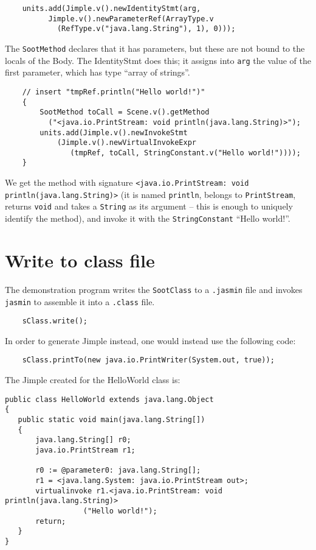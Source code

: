 \documentclass{article}
\begin{document}
\begin{verbatim}
    units.add(Jimple.v().newIdentityStmt(arg, 
          Jimple.v().newParameterRef(ArrayType.v
            (RefType.v("java.lang.String"), 1), 0)));
\end{verbatim}

The {\tt SootMethod} declares that it has parameters, but these are not
bound to the locals of the Body.  The IdentityStmt does this; it assigns
into {\tt arg} the value of the first parameter, which has type ``array of
strings''.

\begin{verbatim}
    // insert "tmpRef.println("Hello world!")"
    {
        SootMethod toCall = Scene.v().getMethod
          ("<java.io.PrintStream: void println(java.lang.String)>");
        units.add(Jimple.v().newInvokeStmt
            (Jimple.v().newVirtualInvokeExpr
               (tmpRef, toCall, StringConstant.v("Hello world!"))));
    }
\end{verbatim}                      

We get the method with signature 
{\tt <java.io.PrintStream: void println(java.lang.String)>}
(it is named {\tt println}, belongs to {\tt PrintStream}, returns 
{\tt void} and
takes a {\tt String} as its argument -- this is enough to uniquely
identify the method), and invoke it with the {\tt StringConstant} 
``Hello world!''.

\section{Write to class file}

The demonstration program writes the {\tt SootClass} to a {\tt .jasmin}
file and invokes {\tt jasmin} to assemble it into a {\tt .class} file.

\noindent
\begin{verbatim}    sClass.write(); \end{verbatim}

In order to generate Jimple instead, one would instead use the following code:
\noindent
\begin{verbatim}    sClass.printTo(new java.io.PrintWriter(System.out, true)); \end{verbatim}

The Jimple created for the HelloWorld class is:

\begin{verbatim}
public class HelloWorld extends java.lang.Object
{
   public static void main(java.lang.String[])
   {
       java.lang.String[] r0;
       java.io.PrintStream r1;

       r0 := @parameter0: java.lang.String[];
       r1 = <java.lang.System: java.io.PrintStream out>;
       virtualinvoke r1.<java.io.PrintStream: void println(java.lang.String)>
                  ("Hello world!");
       return;
   }
}
\end{verbatim}
\end{document}
